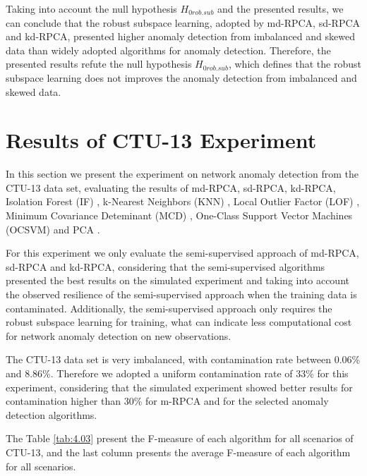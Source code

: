 Taking into account the null hypothesis $H_{0rob.sub}$ and the presented results, we can conclude that the robust subspace learning, adopted by md-RPCA, sd-RPCA and kd-RPCA, presented higher anomaly detection from imbalanced and skewed data than widely adopted algorithms for anomaly detection. Therefore, the presented results refute the null hypothesis $H_{0rob.sub}$, which defines that the robust subspace learning does not improves the anomaly detection from imbalanced and skewed data.


\section{Results of CTU-13 Experiment}
\label{sec:4_ctu13_result}

In this section we present the experiment on network anomaly detection from the CTU-13 data set, evaluating the results of md-RPCA, sd-RPCA, kd-RPCA, Isolation Forest (IF) \cite{liu2008isolation}, k-Nearest Neighbors (KNN) \cite{angiulli2002fast}, Local Outlier Factor (LOF) \cite{breunig2000lof}, Minimum Covariance Deteminant (MCD) \cite{rousseeuw1999fastmcd}, One-Class Support Vector Machines (OCSVM) \cite{scholkopf2001estimating} and PCA \cite{shyu2003novel}.

For this experiment we only evaluate the semi-supervised approach of md-RPCA, sd-RPCA and kd-RPCA, considering that the semi-supervised algorithms presented the best results on the simulated experiment and taking into account the observed resilience of the semi-supervised approach when the training data is contaminated. Additionally, the semi-supervised approach only requires the robust subspace learning for training, what can indicate less computational cost for network anomaly detection on new observations.

The CTU-13 data set is very imbalanced, with contamination rate between 0.06\% and 8.86\%. Therefore we adopted a uniform contamination rate of 33\% for this experiment, considering that the simulated experiment showed better results for contamination higher than 30\% for m-RPCA and for the selected anomaly detection algorithms.

The Table \ref{tab:4.03} present the F-measure of each algorithm for all scenarios of CTU-13, and the last column presents the average F-measure of each algorithm for all scenarios.

